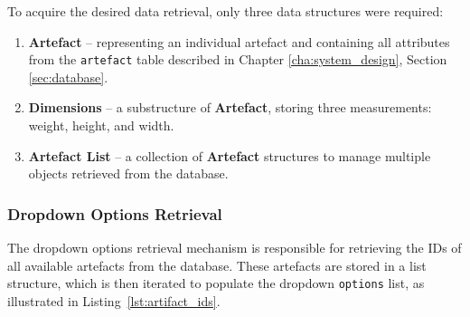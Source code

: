 To acquire the desired data retrieval, only three data structures were required:  
\begin{enumerate}
    \item \textbf{Artefact} – representing an individual artefact and containing all attributes from the \texttt{artefact} table described in Chapter \ref{cha:system_design}, Section \ref{sec:database}.  
    \item \textbf{Dimensions} – a substructure of \textbf{Artefact}, storing three measurements: weight, height, and width.  
    \item \textbf{Artefact List} – a collection of \textbf{Artefact} structures to manage multiple objects retrieved from the database.  
\end{enumerate}



\subsubsection{Dropdown Options Retrieval}
\label{sec:options}

The dropdown options retrieval mechanism is responsible for retrieving the \glspl{ID} of all available artefacts from the database.
These artefacts are stored in a list structure, which is then iterated to populate the dropdown \texttt{options} list, as illustrated in Listing~\ref{lst:artifact_ids}.

